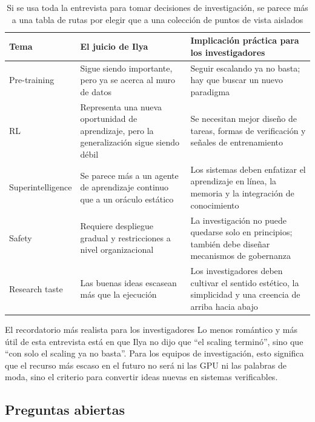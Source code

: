 \documentclass[a4paper]{article}
\begin{document}
\begin{table}[H]
\centering
\begin{tabular}{p{3.1cm}p{3.8cm}p{4.6cm}}
\toprule
\textbf{Tema} & \textbf{El juicio de Ilya} & \textbf{Implicación práctica para los investigadores} \\
\midrule
Pre-training & Sigue siendo importante, pero ya se acerca al muro de datos & Seguir escalando ya no basta; hay que buscar un nuevo paradigma \\
RL & Representa una nueva oportunidad de aprendizaje, pero la generalización sigue siendo débil & Se necesitan mejor diseño de tareas, formas de verificación y señales de entrenamiento \\
Superintelligence & Se parece más a un agente de aprendizaje continuo que a un oráculo estático & Los sistemas deben enfatizar el aprendizaje en línea, la memoria y la integración de conocimiento \\
Safety & Requiere despliegue gradual y restricciones a nivel organizacional & La investigación no puede quedarse solo en principios; también debe diseñar mecanismos de gobernanza \\
Research taste & Las buenas ideas escasean más que la ejecución & Los investigadores deben cultivar el sentido estético, la simplicidad y una creencia de arriba hacia abajo \\
\bottomrule
\end{tabular}
\caption{Si se usa toda la entrevista para tomar decisiones de investigación, se parece más a una tabla de rutas por elegir que a una colección de puntos de vista aislados}
\end{table}

\begin{importantbox}{El recordatorio más realista para los investigadores}
Lo menos romántico y más útil de esta entrevista está en que Ilya no dijo que ``el scaling terminó'', sino que ``con solo el scaling ya no basta''. Para los equipos de investigación, esto significa que el recurso más escaso en el futuro no será ni las GPU ni las palabras de moda, sino el criterio para convertir ideas nuevas en sistemas verificables.
\end{importantbox}

\subsection{Preguntas abiertas}
\end{document}
